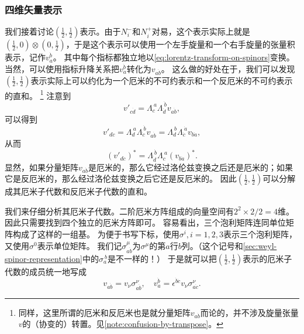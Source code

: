 \subsubsection{四维矢量表示}\label{sec:4-vector-representation}


我们接着讨论$(\frac{1}{2}, \frac{1}{2})$表示。由于$N_i^-$和$N_i^+$对易，这个表示实际上就是$(\frac{1}{2}, 0) \otimes (0, \frac{1}{2})$，于是这个表示可以使用一个左手旋量和一个右手旋量的张量积表示，记作$v_a^{\dot{b}}$。
其中每个指标都独立地以\eqref{eq:lorentz-transform-on-spinors}变换。
当然，可以使用指标升降关系把$v_a^{\dot{b}}$转化为$v_{a\dot{b}}$。
这么做的好处在于，我们可以发现$(\frac{1}{2}, \frac{1}{2})$表示实际上可以约化为一个厄米的不可约表示和一个反厄米的不可约表示的直和。%
\footnote{同样，这里所谓的厄米和反厄米也是就分量矩阵$v_{a\dot{b}}$而论的，并不涉及旋量张量$v$的（协变的）转置。见\autoref{note:confusion-by-transpose}。}
注意到
\[
    v'_{c\dot{d}} = \Lambda_c^{\ a} \Lambda_{\dot{d}}^{\ \dot{b}} v_{a\dot{b}},
\]
可以得到
\[
    v'_{d\dot{c}} = \Lambda_d^{\ a} \Lambda_{\dot{c}}^{\ \dot{b}} v_{a\dot{b}} = \Lambda_d^{\ b} \Lambda_{\dot{c}}^{\ \dot{a}} v_{b\dot{a}},
\]
从而
\[
    (v'_{d\dot{c}})^* = \Lambda_{\dot{d}}^{\ \dot{b}} \Lambda_{c}^{\ a} (v_{b\dot{a}})^*.
\]
显然，如果分量矩阵$v_{a\dot{b}}$是厄米的，那么它经过洛伦兹变换之后还是厄米的；如果它是反厄米的，那么经过洛伦兹变换之后它还是反厄米的。
因此$(\frac{1}{2}, \frac{1}{2})$可以分解成其厄米子代数和反厄米子代数的直和。

我们来仔细分析其厄米子代数。二阶厄米方阵组成的向量空间有$2^2 \times 2 / 2 = 4$维。因此只需要找到四个独立的厄米方阵即可。
容易看出，三个泡利矩阵连同单位矩阵构成了这样的一组基。
为便于书写下标，使用$\sigma^i, i=1, 2, 3$表示三个泡利矩阵，又使用$\sigma^0$表示单位矩阵。
我们记$\sigma^\mu_{a\dot{b}}$为$\sigma^\mu$的第$a$行$b$列。（这个记号和\autoref{sec:weyl-spinor-representation}中的$\sigma_a^{\ b}$是不一样的！）
于是就可以把$(\frac{1}{2}, \frac{1}{2})$表示的厄米子代数的成员统一地写成
\begin{equation}
    v_{a\dot{b}} = v_\nu \sigma^\nu_{a\dot{b}}, \quad v_a^{\dot{b}} = \epsilon^{\dot{b} \dot{c}} v_\nu \sigma^\nu_{a \dot{c}}.
    \label{eq:vector-is-spin-tensor}
\end{equation}


